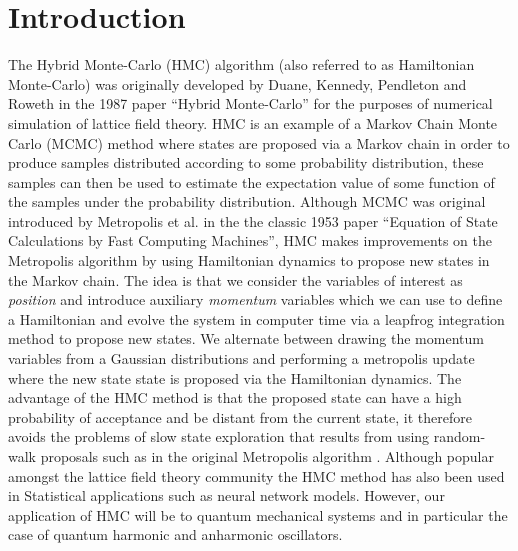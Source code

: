 \documentclass[12pt]{article}
\begin{document}
\section{Introduction}
 The Hybrid Monte-Carlo (HMC) algorithm (also referred to as Hamiltonian Monte-Carlo) was originally developed by Duane, Kennedy, Pendleton and Roweth in the 1987 paper ``Hybrid Monte-Carlo'' \cite{duane_kennedy_pendleton_roweth_1987} for the purposes of numerical simulation of lattice field theory. HMC is an example of a Markov Chain Monte Carlo (MCMC) method where states are proposed via a Markov chain in order to produce samples distributed according to some probability distribution, these samples can then be used to estimate the expectation value of some function of the samples under the probability distribution. Although MCMC was original introduced by Metropolis et al. in the the classic 1953 paper ``Equation of State Calculations by Fast Computing Machines''\cite{metropolis_rosenbluth_rosenbluth_teller_teller_1953}, HMC makes improvements on the Metropolis algorithm by using Hamiltonian dynamics to propose new states in the Markov chain. The idea is that we consider the variables of interest as \textit{position} and introduce auxiliary \textit{momentum} variables which we can use to define a Hamiltonian and evolve the system in computer time via a leapfrog integration method to propose new states. We alternate between drawing the momentum variables from a Gaussian distributions and performing a metropolis update where the new state state is proposed via the Hamiltonian dynamics. The advantage of the HMC method is that the proposed state can have a high probability of acceptance and be distant from the current state, it therefore avoids the problems of slow state exploration that results from using random-walk proposals such as in the original Metropolis algorithm \cite{metropolis_rosenbluth_rosenbluth_teller_teller_1953}. Although popular amongst the lattice field theory community the HMC method has also been used in Statistical applications \cite{neal_1996_a} \cite{ishwaran_1999} \cite{schmidt_2009} such as neural network models. However, our application of HMC will be to quantum mechanical systems and in particular the case of quantum harmonic and anharmonic oscillators.
\end{document}
